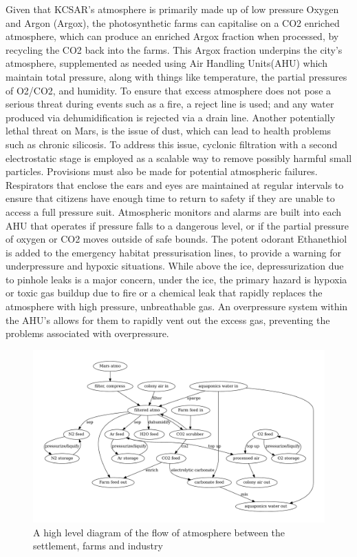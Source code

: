 \documentclass[fleqn,10pt]{Stylesheet} %
\begin{document}
Given that KCSAR’s atmosphere is primarily made up of low pressure Oxygen and Argon (Argox), the photosynthetic farms can capitalise on a CO2 enriched atmosphere, which can produce an enriched Argox fraction when processed, by recycling the CO2 back into the farms. This  Argox fraction underpins  the city’s atmosphere, supplemented as needed using Air Handling Units(AHU) which maintain total pressure, along with things like temperature, the partial pressures of O2/CO2, and humidity. To ensure that excess atmosphere does not pose a serious threat during events such as a fire, a reject line is used; and any water produced via dehumidification is rejected via a drain line. Another potentially lethal threat on Mars, is the issue of dust, which can lead to health problems such as chronic silicosis. To address this issue, cyclonic filtration with a second electrostatic stage is employed as a scalable way to remove possibly harmful small particles. Provisions must also be made for potential atmospheric failures. Respirators that enclose the ears and eyes are maintained at regular intervals to ensure that citizens have enough time to return to safety if they are unable to access a full pressure suit. Atmospheric monitors and alarms are built into each AHU that operates if pressure falls to a dangerous level, or if the partial pressure of oxygen or CO2 moves outside of safe bounds. The potent odorant Ethanethiol is added to the emergency habitat pressurisation lines, to provide a warning for underpressure and hypoxic situations. While above the ice, depressurization due to pinhole leaks is a major concern, under the ice, the primary hazard is hypoxia or toxic gas buildup due to fire or a chemical leak that rapidly replaces the atmosphere with high pressure, unbreathable gas. An overpressure system within the AHU’s allows for them to rapidly vent out the excess gas, preventing the problems associated with overpressure.

\begin{figure}
    \centering
    \includegraphics[width=\linewidth]{figures/fig_atmo.pdf}
    \caption{A high level diagram of the flow of atmosphere between the settlement, farms and industry}
    \label{fig:atmo_diagram}
\end{figure}
\end{document}
